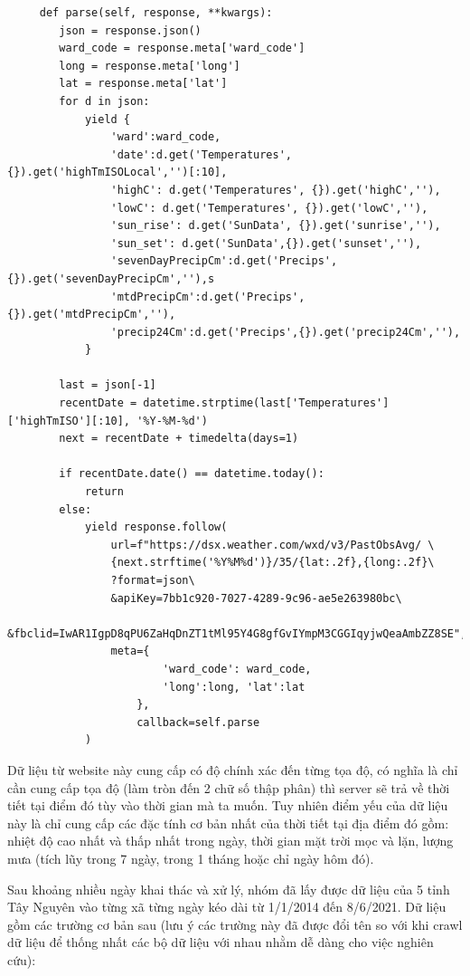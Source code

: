 \documentclass{article}
\begin{document}
\begin{verbatim}
	 def parse(self, response, **kwargs):
        json = response.json()
        ward_code = response.meta['ward_code']
        long = response.meta['long']
        lat = response.meta['lat']
        for d in json:
            yield {
                'ward':ward_code,
                'date':d.get('Temperatures', {}).get('highTmISOLocal','')[:10],
                'highC': d.get('Temperatures', {}).get('highC',''),
                'lowC': d.get('Temperatures', {}).get('lowC',''),
                'sun_rise': d.get('SunData', {}).get('sunrise',''),
                'sun_set': d.get('SunData',{}).get('sunset',''),
                'sevenDayPrecipCm':d.get('Precips',{}).get('sevenDayPrecipCm',''),s
                'mtdPrecipCm':d.get('Precips',{}).get('mtdPrecipCm',''),
                'precip24Cm':d.get('Precips',{}).get('precip24Cm',''),
            }

		last = json[-1]
        recentDate = datetime.strptime(last['Temperatures']['highTmISO'][:10], '%Y-%M-%d')
        next = recentDate + timedelta(days=1)
		
		if recentDate.date() == datetime.today():
        	return
        else:
            yield response.follow(
                url=f"https://dsx.weather.com/wxd/v3/PastObsAvg/ \
				{next.strftime('%Y%M%d')}/35/{lat:.2f},{long:.2f}\
				?format=json\
				&apiKey=7bb1c920-7027-4289-9c96-ae5e263980bc\
				&fbclid=IwAR1IgpD8qPU6ZaHqDnZT1tMl95Y4G8gfGvIYmpM3CGGIqyjwQeaAmbZZ8SE",
                meta={
                        'ward_code': ward_code,
                        'long':long, 'lat':lat
                    },
                    callback=self.parse
            )
\end{verbatim}

Dữ liệu từ website này cung cấp có độ chính xác đến từng tọa độ, có nghĩa là chỉ cần cung cấp tọa độ (làm tròn đến 2 chữ số thập phân) thì server sẽ trả về thời tiết tại điểm đó tùy vào thời gian mà ta muốn. Tuy nhiên điểm yếu của dữ liệu này là chỉ cung cấp các đặc tính cơ bản nhất của thời tiết tại địa điểm đó gồm: nhiệt độ cao nhất và thấp nhất trong ngày, thời gian mặt trời mọc và lặn, lượng mưa (tích lũy trong 7 ngày, trong 1 tháng hoặc chỉ ngày hôm đó).

Sau khoảng nhiều ngày khai thác và xử lý, nhóm đã lấy được dữ liệu của 5 tỉnh Tây Nguyên vào từng xã từng ngày kéo dài từ 1/1/2014 đến 8/6/2021. Dữ liệu gồm các trường cơ bản sau (lưu ý các trường này đã được đổi tên so với khi crawl dữ liệu để thống nhất các bộ dữ liệu với nhau nhằm dễ dàng cho việc nghiên cứu):
\end{document}
